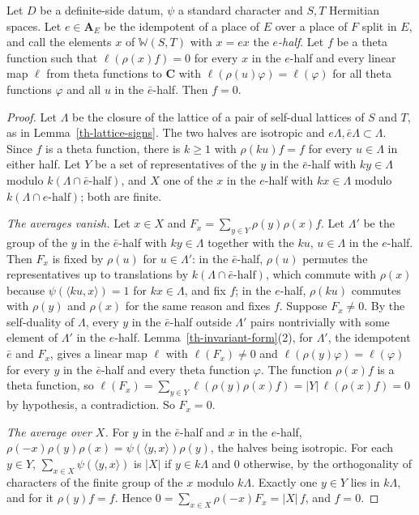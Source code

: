 \begin{lemma}\label{th-split-separation}
Let $D$ be a definite-side datum, $\psi$ a standard character and $S,T$
Hermitian spaces. Let $e\in\mathbf A_E$ be the idempotent of a place of $E$ over
a place of $F$ split in $E$, and call the elements $x$ of $\mathbb W(S,T)$ with
$x=ex$ the \emph{$e$-half}. Let $f$ be a theta function such that
$\ell(\rho(x)f)=0$ for every $x$ in the $e$-half and every linear map $\ell$ from
theta functions to $\mathbf C$ with $\ell(\rho(u)\varphi)=\ell(\varphi)$ for all
theta functions $\varphi$ and all $u$ in the $\bar e$-half. Then $f=0$.
\end{lemma}
\begin{proof}
Let $\Lambda$ be the closure of the lattice of a pair of self-dual lattices of
$S$ and $T$, as in Lemma~\ref{th-lattice-signs}. The two halves are isotropic
and $e\Lambda,\bar e\Lambda\subset\Lambda$. Since $f$ is a theta function, there
is $k\geq1$ with $\rho(ku)f=f$ for every $u\in\Lambda$ in either half. Let $Y$ be
a set of representatives of the $y$ in the $\bar e$-half with $ky\in\Lambda$
modulo $k(\Lambda\cap\bar e\text{-half})$, and $X$ one of the $x$ in the
$e$-half with $kx\in\Lambda$ modulo $k(\Lambda\cap e\text{-half})$; both are
finite.

\emph{The averages vanish.} Let $x\in X$ and
$F_x=\sum_{y\in Y}\rho(y)\rho(x)f$. Let $\Lambda'$ be the group of the $y$ in the
$\bar e$-half with $ky\in\Lambda$ together with the $ku$, $u\in\Lambda$ in the
$e$-half. Then $F_x$ is fixed by $\rho(u)$ for $u\in\Lambda'$: in the
$\bar e$-half, $\rho(u)$ permutes the representatives up to translations by
$k(\Lambda\cap\bar e\text{-half})$, which commute with $\rho(x)$ because
$\psi(\langle ku,x\rangle)=1$ for $kx\in\Lambda$, and fix $f$; in the $e$-half,
$\rho(ku)$ commutes with $\rho(y)$ and $\rho(x)$ for the same reason and fixes
$f$. Suppose $F_x\neq0$. By the self-duality of $\Lambda$, every $y$ in the
$\bar e$-half outside $\Lambda'$ pairs nontrivially with some element of
$\Lambda'$ in the $e$-half. Lemma~\ref{th-invariant-form}(2), for $\Lambda'$, the
idempotent $\bar e$ and $F_x$, gives a linear map $\ell$ with $\ell(F_x)\neq0$
and $\ell(\rho(y)\varphi)=\ell(\varphi)$ for every $y$ in the $\bar e$-half and
every theta function $\varphi$. The function $\rho(x)f$ is a theta function, so
$\ell(F_x)=\sum_{y\in Y}\ell(\rho(y)\rho(x)f)=|Y|\,\ell(\rho(x)f)=0$ by
hypothesis, a contradiction. So $F_x=0$.

\emph{The average over $X$.} For $y$ in the $\bar e$-half and $x$ in the
$e$-half, $\rho(-x)\rho(y)\rho(x)=\psi(\langle y,x\rangle)\rho(y)$, the halves
being isotropic. For each $y\in Y$, $\sum_{x\in X}\psi(\langle y,x\rangle)$ is
$|X|$ if $y\in k\Lambda$ and $0$ otherwise, by the orthogonality of characters
of the finite group of the $x$ modulo $k\Lambda$. Exactly one $y\in Y$ lies in
$k\Lambda$, and for it $\rho(y)f=f$. Hence
$0=\sum_{x\in X}\rho(-x)F_x=|X|\,f$, and $f=0$.
\end{proof}

